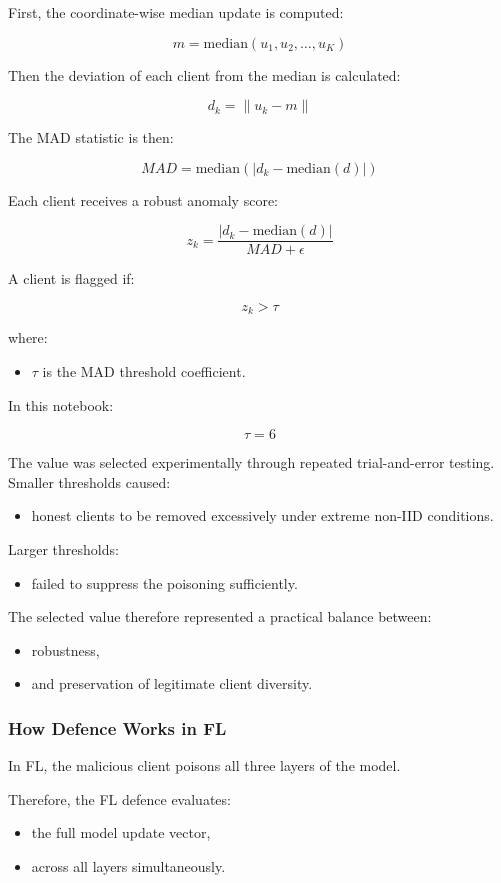 First, the coordinate-wise median update is computed:

\[
m
=
\text{median}(u_1, u_2, \dots, u_K)
\]

Then the deviation of each client from the median is calculated:

\[
d_k
=
\|u_k - m\|
\]

The MAD statistic is then:

\[
MAD
=
\text{median}
\left(
|d_k - \text{median}(d)|
\right)
\]

Each client receives a robust anomaly score:

\[
z_k
=
\frac{|d_k - \text{median}(d)|}{MAD + \epsilon}
\]

A client is flagged if:

\[
z_k > \tau
\]

where:
\begin{itemize}
    \item $\tau$ is the MAD threshold coefficient.
\end{itemize}

In this notebook:

\[
\tau = 6
\]

The value was selected experimentally through repeated trial-and-error testing. Smaller thresholds caused:
\begin{itemize}
    \item honest clients to be removed excessively under extreme non-IID conditions.
\end{itemize}

Larger thresholds:
\begin{itemize}
    \item failed to suppress the poisoning sufficiently.
\end{itemize}

The selected value therefore represented a practical balance between:
\begin{itemize}
    \item robustness,
    \item and preservation of legitimate client diversity.
\end{itemize}

\subsubsection*{How Defence Works in FL}

In FL, the malicious client poisons all three layers of the model.

Therefore, the FL defence evaluates:
\begin{itemize}
    \item the full model update vector,
    \item across all layers simultaneously.
\end{itemize}

